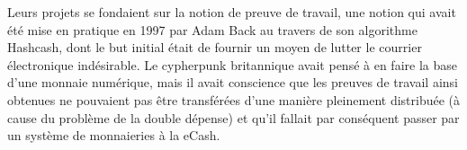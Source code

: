 Leurs projets se fondaient sur la notion de preuve de travail, une notion qui avait été mise en pratique en 1997 par Adam Back au travers de son algorithme Hashcash, dont le but initial était de fournir un moyen de lutter le courrier électronique indésirable. Le cypherpunk britannique avait pensé à en faire la base d'une monnaie numérique, mais il avait conscience que les preuves de travail ainsi obtenues ne pouvaient pas être transférées d'une manière pleinement distribuée (à cause du problème de la double dépense) et qu'il fallait par conséquent passer par un système de monnaieries à la eCash. %
%

